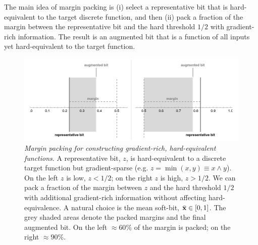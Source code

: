 \documentclass{article} %
\begin{document}
The main idea of margin packing is (i) select a representative bit that is hard-equivalent to the target discrete function, and then (ii) pack a fraction of the margin between the representative bit and the hard threshold $1/2$ with gradient-rich information. The result is an augmented bit that is a function of all inputs yet hard-equivalent to the target function.

\begin{figure}[t]
	\centering
	\includegraphics[trim=30pt 5pt 30pt 10pt, clip, width=1.0\textwidth]{margin-trick.png}
	\caption{{\em Margin packing for constructing gradient-rich, hard-equivalent functions}. A representative bit, $z$, is hard-equivalent to a discrete target function but gradient-sparse (e.g. $z=\operatorname{min}(x,y) \equiv x \wedge y$). On the left $z$ is low, $z<1/2$; on the right $z$ is high, $z>1/2$. We can pack a fraction of the margin between $z$ and the hard threshold $1/2$ with additional gradient-rich information without affecting hard-equivalence. A natural choice is the mean soft-bit, $\bar{\bf x} \in [0,1]$. The grey shaded areas denote the packed margins and the final augmented bit. On the left $\approx 60\%$ of the margin is packed; on the right $\approx 90\%$.}
	\label{fig:margin-trick}
\end{figure}
\end{document}
